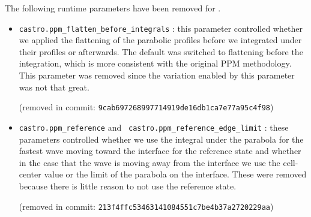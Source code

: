 The following runtime parameters have been removed for \castro.
\begin{itemize}
\item {\tt castro.ppm\_flatten\_before\_integrals} : this parameter
  controlled whether we applied the flattening of the parabolic
  profiles before we integrated under their profiles or afterwards.
  The default was switched to flattening before the integration,
  which is more consistent with the original PPM methodology.  This
  parameter was removed since the variation enabled by this parameter
  was not that great. 

  (removed in commit: {\tt 9cab697268997714919de16db1ca7e77a95c4f98})


\item {\tt castro.ppm\_reference} and {\tt
  castro.ppm\_reference\_edge\_limit} : these parameters controlled
  whether we use the integral under the parabola for the fastest wave
  moving toward the interface for the reference state and whether in
  the case that the wave is moving away from the interface we use the
  cell-center value or the limit of the parabola on the interface.
  These were removed because there is little reason to not use the
  reference state.

  (removed in commit: {\tt 213f4ffc53463141084551c7be4b37a2720229aa})
\end{itemize}


